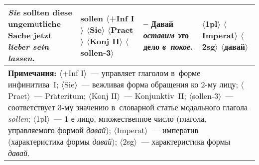 \begin{multicols}{2}
\begin{table*}
\begin{center}
\begin{tabular}{|p{40mm}| p{14mm}| p{40mm}| p{14mm}|}
\hline
\textit{Sie} \textbf{sollten} diese ungem$\ddot{\mbox{u}}$tliche Sache jetzt \textit{lieber sein 
lassen}.
&\textbf{sollen}\newline 
$\langle$+Inf I$\rangle$\newline 
$\langle$Sie$\rangle$\newline 
$\langle$Praet$\rangle$\newline 
$\langle$Konj II$\rangle$\newline 
$\langle$sollen-3$\rangle$
&-- \textbf{Давай} \textit{оставим} это дело \textit{в~покое}.
&$\langle$1pl$\rangle$\newline
$\langle$Imperat$\rangle$\newline
$\langle$2sg$\rangle$\newline
$\langle$давай$\rangle$\\
\hline 
\multicolumn{4}{p{121mm}}{\footnotesize \hspace*{3mm}\textbf{Примечания:} %
$\langle$+Inf I$\rangle$~--- управляет глаголом в~форме инфинитива~I; %
$\langle$Sie$\rangle$~--- вежливая форма обращения ко 2-му лицу; %
$\langle$Praet$\rangle$~--- Pr$\ddot{\mbox{a}}$teritum; %
$\langle$Konj II$\rangle$~--- Konjunktiv~II; %
$\langle$sollen-3$\rangle$~--- соответствует 3-му значению в~словарной статье модального глагола 
\textit{sollen}; %
$\langle$1pl$\rangle$~--- 1-е лицо, множественное число (глагола, управляемого формой \textit{давай}); %
$\langle$Imperat$\rangle$~--- императив (характеристика формы \textit{давай}); %
$\langle$2sg$\rangle$~--- характеристика формы \textit{давай}.}
\end{tabular}
\end{center}
\vspace*{-6pt}
\end{table*}


\begin{table*}\small %
\begin{center}
\vspace*{2ex}


\end{center}
\end{table*}
\end{multicols}
